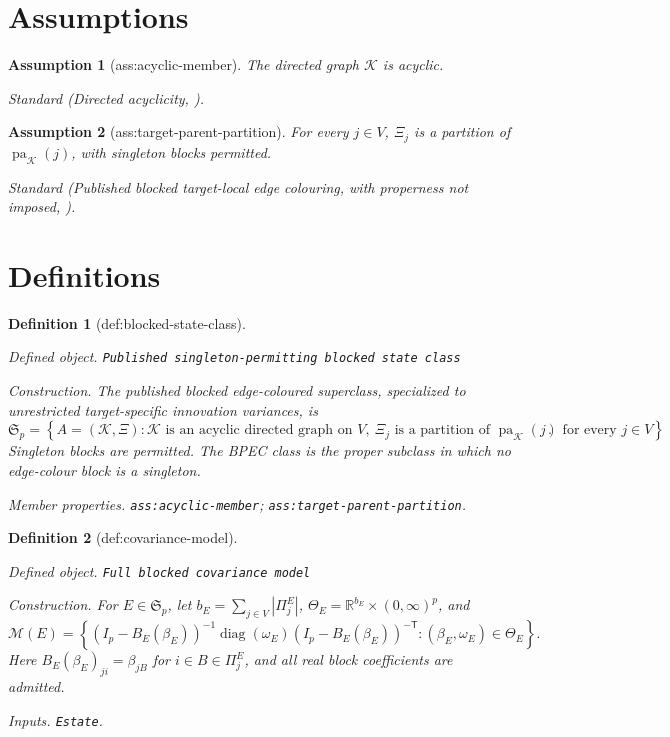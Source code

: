 \documentclass{article}
\newtheorem{assumption}{Assumption}
\newtheorem{definition}{Definition}
\begin{document}
\section{Assumptions}

\begin{assumption}[ass:acyclic-member]\label{ass:acyclic-member}
The directed graph \(\mathcal K\) is acyclic.
\par\smallskip\noindent\emph{Standard} (Directed acyclicity, \cite{Chickering1995}).
\end{assumption}

\begin{assumption}[ass:target-parent-partition]\label{ass:target-parent-partition}
For every \(j\in V\), \(\Xi_j\) is a partition of \(\operatorname{pa}_{\mathcal K}(j)\), with singleton blocks permitted.
\par\smallskip\noindent\emph{Standard} (Published blocked target-local edge colouring, with properness not imposed, \cite{BoegeKubjasMisraSolus2026}).
\end{assumption}

\section{Definitions}

\begin{definition}[def:blocked-state-class]\label{def:blocked-state-class}
\par\smallskip\noindent\emph{Defined object.} \texttt{Published singleton-\allowbreak{}permitting blocked state class}
\par\smallskip\noindent\emph{Construction.} The published blocked edge-coloured superclass, specialized to unrestricted target-specific innovation variances, is
\[
\mathfrak S_p=\left\{A=(\mathcal K,\Xi):\mathcal K\text{ is an acyclic directed graph on }V,\ \Xi_j\text{ is a partition of }\operatorname{pa}_{\mathcal K}(j)\text{ for every }j\in V\right\}.
\]
Singleton blocks are permitted. The BPEC class is the proper subclass in which no edge-colour block is a singleton.
\par\smallskip\noindent\emph{Member properties.} \texttt{ass:\allowbreak{}acyclic-\allowbreak{}member}; \texttt{ass:\allowbreak{}target-\allowbreak{}parent-\allowbreak{}partition}.
\end{definition}

\begin{definition}[def:covariance-model]\label{def:covariance-model}
\par\smallskip\noindent\emph{Defined object.} \texttt{Full blocked covariance model}
\par\smallskip\noindent\emph{Construction.} For \(E\in\mathfrak S_p\), let \(b_E=\sum_{j\in V}|\Pi^E_j|\), \(\Theta_E=\mathbb R^{b_E}\times(0,\infty)^p\), and \[\mathcal M(E)=\left\{(I_p-B_E(\beta_E))^{-1}\operatorname{diag}(\omega_E)(I_p-B_E(\beta_E))^{-\mathsf T}:(\beta_E,\omega_E)\in\Theta_E\right\}.\] Here \(B_E(\beta_E)_{ji}=\beta_{jB}\) for \(i\in B\in\Pi^E_j\), and all real block coefficients are admitted.
\par\smallskip\noindent\emph{Inputs.} \texttt{Estate}.
\end{definition}
\end{document}
